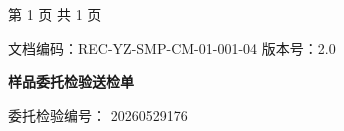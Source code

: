 \documentclass[UTF8,10pt,a4paper,fontset=fandol]{ctexart}
\newcommand{\fieldvalue}[1]{#1}
\begin{document}
\vfill

\begin{center}
第 1 页 共 1 页
\end{center}

\newpage

\begin{center}
文档编码：REC-YZ-SMP-CM-01-001-04 \quad 版本号：2.0

\textbf{\large 样品委托检验送检单}
\end{center}

委托检验编号：
\fieldvalue{20260529176}

\vspace{0.4em}
\end{document}
